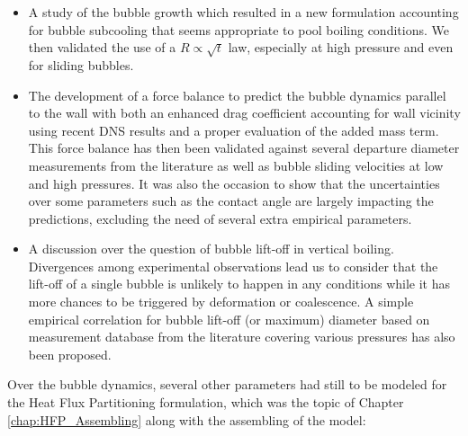 \begin{itemize}
\item A study of the bubble growth which resulted in a new formulation accounting for bubble subcooling that seems appropriate to pool boiling conditions. We then validated the use of a $R \propto \sqrt{t}$ law, especially at high pressure and even for sliding bubbles.

\item The development of a force balance to predict the bubble dynamics parallel to the wall with both an enhanced drag coefficient accounting for wall vicinity using recent DNS results \cite{shi_drag_2021} and a proper evaluation of the added mass term. This force balance has then been validated against several departure diameter measurements from the literature as well as bubble sliding velocities at low and high pressures. It was also the occasion to show that the uncertainties over some parameters such as the contact angle are largely impacting the predictions, excluding the need of several extra empirical parameters.

\item A discussion over the question of bubble lift-off in vertical boiling. Divergences among experimental observations lead us to consider that the lift-off of a single bubble is unlikely to happen in any conditions while it has more chances to be triggered by deformation or coalescence. A simple empirical correlation for bubble lift-off (or maximum) diameter based on measurement database from the literature covering various pressures has also been proposed.
\end{itemize}

Over the bubble dynamics, several other parameters had still to be modeled for the Heat Flux Partitioning formulation, which was the topic of Chapter \ref{chap:HFP_Assembling} along with the assembling of the model:

